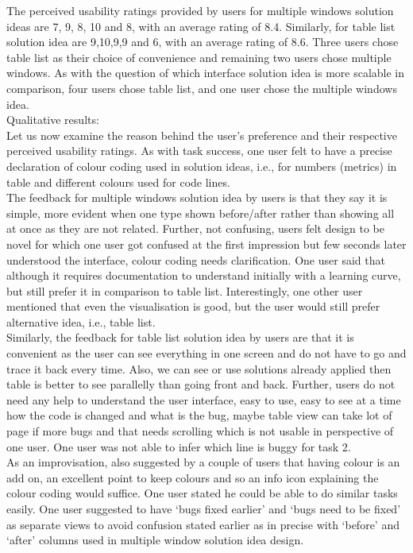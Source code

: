 The perceived usability ratings provided by users for multiple windows solution ideas are 7, 9, 8, 10 and 8, with an average rating of 8.4. Similarly, for table list solution idea are 9,10,9,9 and 6, with an average rating of 8.6. Three users chose table list as their choice of convenience and remaining two users chose multiple windows.
As with the question of which interface solution idea is more scalable in comparison, four users chose table list, and one user chose the multiple windows idea. \\

Qualitative results: \\

Let us now examine the reason behind the user’s preference and their respective perceived usability ratings. As with task success, one user felt to have a precise declaration of colour coding used in solution ideas, i.e., for numbers (metrics) in table and different colours used for code lines. \\

The feedback for multiple windows solution idea by users is that they say it is simple, more evident when one type shown before/after rather than showing all at once as they are not related. Further, not confusing, users felt design to be novel for which one user got confused at the first impression but few seconds later understood the interface, colour coding needs clarification. One user said that although it requires documentation to understand initially with a learning curve, but still prefer it in comparison to table list. Interestingly, one other user mentioned that even the visualisation is good, but the user would still prefer alternative idea, i.e., table list. \\

Similarly, the feedback for table list solution idea by users are that it is convenient as the user can see everything in one screen and do not have to go and trace it back every time. Also, we can see or use solutions already applied then table is better to see parallelly than going front and back. Further, users do not need any help to understand the user interface, easy to use, easy to see at a time how the code is changed and what is the bug, maybe table view can take lot of page if more bugs and that needs scrolling which is not usable in perspective of one user. One user was not able to infer which line is buggy for task 2. \\

As an improvisation, also suggested by a couple of users that having colour is an add on, an excellent point to keep colours and so an info icon explaining the colour coding would suffice. One user stated he could be able to do similar tasks easily. One user suggested to have ‘bugs fixed earlier’ and ‘bugs need to be fixed’ as separate views to avoid confusion stated earlier as in precise with ‘before’ and ‘after’ columns used in multiple window solution idea design. \\

